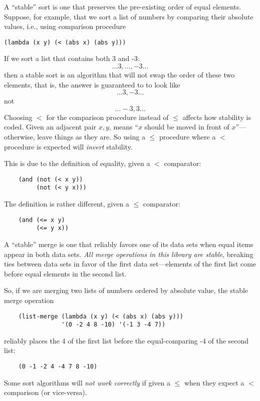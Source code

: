 A ``stable'' sort is one that preserves the pre-existing order of equal
elements. Suppose, for example, that we sort a list of numbers by 
comparing their absolute values, i.e., using comparison procedure
%
\begin{verbatim}
(lambda (x y) (< (abs x) (abs y)))
\end{verbatim}
%
If we sort a list that contains both 3 and -3: \[\ldots 3, \ldots, -3 \ldots\]
then a stable sort is an algorithm that will not swap the order
of these two elements, that is, the answer is guaranteed to to look like
\[\ldots 3, -3 \ldots\]
not
\[\ldots -3, 3 \ldots\]
Choosing $<$ for the comparison procedure instead of $\leq$ affects
how stability is coded. Given an adjacent pair $x, y$,  means ``$x$ should be moved in front of $x$''---otherwise,
leave things as they are. So using a $\leq$ procedure where a $<$
procedure is expected will \emph{invert} stability.

This is due to the definition of equality, given a $<$ comparator:
\begin{verbatim}
    (and (not (< x y))
         (not (< y x)))
\end{verbatim}
The definition is rather different, given a $\leq$ comparator:
\begin{verbatim}
    (and (<= x y)
         (<= y x))
\end{verbatim}
%
A ``stable'' merge is one that reliably favors one of its data sets
when equal items appear in both data sets. \emph{All merge operations in
this library are stable}, breaking ties between data sets in favor
of the first data set---elements of the first list come before equal 
elements in the second list.

So, if we are merging two lists of numbers ordered by absolute value,
the stable merge operation 
\begin{verbatim}
    (list-merge (lambda (x y) (< (abs x) (abs y)))
                '(0 -2 4 8 -10) '(-1 3 -4 7))
\end{verbatim}
reliably places the 4 of the first list before the equal-comparing -4
  of the second list:
\begin{verbatim}
    (0 -1 -2 4 -4 7 8 -10)
\end{verbatim}
%
  Some sort algorithms will \emph{not work correctly} if given a $\leq$
  when they expect a $<$ comparison (or vice-versa).

